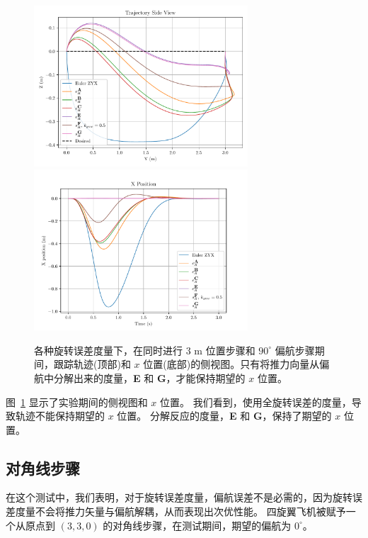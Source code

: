 \begin{figure}
  \begin{center}
  \includegraphics[width=8cm]{media/yawstep/sideview.pdf}
  \includegraphics[width=8cm]{media/yawstep/X_Position.pdf}
  \caption{各种旋转误差度量下，在同时进行 $3$ m 位置步骤和 $90^\circ$ 偏航步骤期间，跟踪轨迹(顶部)和 $x$ 位置(底部)的侧视图。只有将推力向量从偏航中分解出来的度量，\textbf{E} 和 \textbf{G}，才能保持期望的 $x$ 位置。}
  \label{fig:ys_side}
  \end{center}
\end{figure}

图~\ref{fig:ys_side} 显示了实验期间的侧视图和 $x$ 位置。
我们看到，使用全旋转误差的度量，导致轨迹不能保持期望的 $x$ 位置。
分解反应的度量，\textbf{E} 和 \textbf{G}，保持了期望的 $x$ 位置。

\subsection{对角线步骤}

在这个测试中，我们表明，对于旋转误差度量，偏航误差不是必需的，因为旋转误差度量不会将推力矢量与偏航解耦，从而表现出次优性能。
四旋翼飞机被赋予一个从原点到 $(3, 3, 0)$ 的对角线步骤，在测试期间，期望的偏航为 $0^\circ$。

